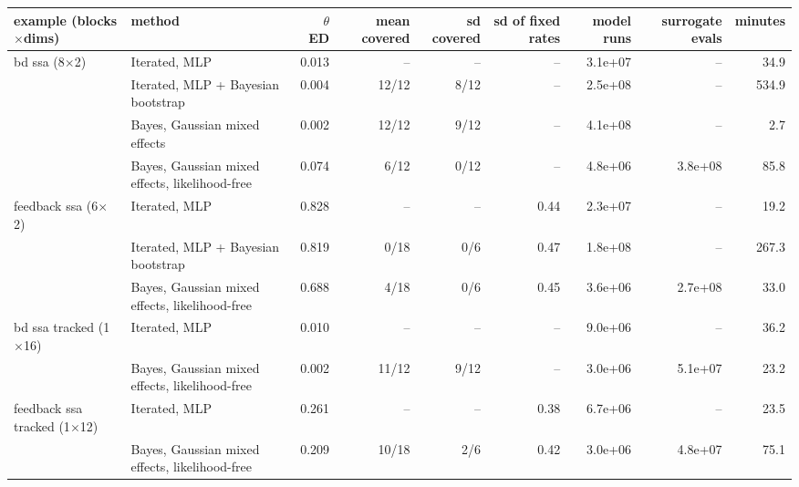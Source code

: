 \begin{tabular}{llrrrrrrr}
\toprule
example (blocks$\times$dims) & method & $\theta$ ED & mean covered & sd covered & sd of fixed rates & model runs & surrogate evals & minutes \\
\midrule
bd ssa (8$\times$2) & Iterated, MLP & 0.013 & -- & -- & -- & 3.1e+07 & -- & 34.9 \\
 & Iterated, MLP + Bayesian bootstrap & 0.004 & 12/12 & 8/12 & -- & 2.5e+08 & -- & 534.9 \\
 & Bayes, Gaussian mixed effects & 0.002 & 12/12 & 9/12 & -- & 4.1e+08 & -- & 2.7 \\
 & Bayes, Gaussian mixed effects, likelihood-free & 0.074 & 6/12 & 0/12 & -- & 4.8e+06 & 3.8e+08 & 85.8 \\ \addlinespace
feedback ssa (6$\times$2) & Iterated, MLP & 0.828 & -- & -- & 0.44 & 2.3e+07 & -- & 19.2 \\
 & Iterated, MLP + Bayesian bootstrap & 0.819 & 0/18 & 0/6 & 0.47 & 1.8e+08 & -- & 267.3 \\
 & Bayes, Gaussian mixed effects, likelihood-free & 0.688 & 4/18 & 0/6 & 0.45 & 3.6e+06 & 2.7e+08 & 33.0 \\ \addlinespace
bd ssa tracked (1$\times$16) & Iterated, MLP & 0.010 & -- & -- & -- & 9.0e+06 & -- & 36.2 \\
 & Bayes, Gaussian mixed effects, likelihood-free & 0.002 & 11/12 & 9/12 & -- & 3.0e+06 & 5.1e+07 & 23.2 \\ \addlinespace
feedback ssa tracked (1$\times$12) & Iterated, MLP & 0.261 & -- & -- & 0.38 & 6.7e+06 & -- & 23.5 \\
 & Bayes, Gaussian mixed effects, likelihood-free & 0.209 & 10/18 & 2/6 & 0.42 & 3.0e+06 & 4.8e+07 & 75.1 \\
\bottomrule
\end{tabular}
